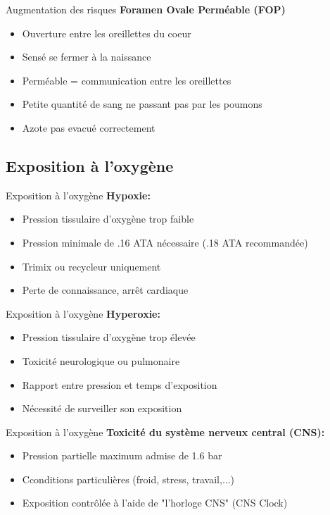 \begin{frame}{Augmentation des risques}
	\textbf{Foramen Ovale Perméable (FOP) }	
	\begin{itemize}
		\item Ouverture entre les oreillettes du coeur
		\item Sensé se fermer à la naissance
		\item Perméable = communication entre les oreillettes
		\item Petite quantité de sang ne passant pas par les poumons
		\item Azote pas evacué correctement
	\end{itemize}
\end{frame}

\subsection{Exposition à l'oxygène}
	\begin{frame}{Exposition à l'oxygène}  
		\textbf{Hypoxie:}	
		\begin{itemize}
			\item Pression tissulaire d'oxygène trop faible
			\item Pression minimale de .16 ATA nécessaire (.18 ATA recommandée)
			\item Trimix ou recycleur uniquement
			\item Perte de connaissance, arrêt cardiaque
		\end{itemize}
	\end{frame}
	
	\begin{frame}{Exposition à l'oxygène} 
		\textbf{Hyperoxie:}	
		\begin{itemize}
			\item Pression tissulaire d'oxygène trop élevée
			\item Toxicité neurologique ou pulmonaire
			\item Rapport entre pression et temps d'exposition
			\item Nécessité de surveiller son exposition
		\end{itemize}
	\end{frame}

	\begin{frame}{Exposition à l'oxygène}
		\textbf{Toxicité du système nerveux central (CNS):}	
		\begin{itemize}
			\item Pression partielle maximum admise de 1.6 bar
			\item Cconditions particulières (froid, stress, travail,...)
			\item Exposition contrôlée à l'aide de "l'horloge CNS" (CNS Clock)
		\end{itemize}
	\end{frame}

